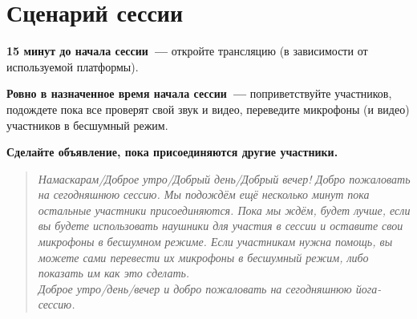 \newpage
\section*{Сценарий сессии}
\label{sec:plan}

\textbf{15 минут до начала сессии~---} откройте трансляцию (в зависимости от используемой платформы). 

\textbf{Ровно в назначенное время начала сессии~---} поприветствуйте участников, подождете пока все проверят свой звук и видео, переведите микрофоны (и видео) участников в бесшумный режим.

\textbf{Сделайте объявление, пока присоединяются другие участники.}
\begin{quote}\emph{%
\noindent%
Намаскарам/Доброе утро/Добрый день/Добрый вечер!
Добро пожаловать на сегодняшнюю сессию. Мы подождём ещё несколько
минут пока остальные участники присоединяются. Пока мы ждём, будет
лучше, если вы будете использовать наушники для участия в сессии и
оставите свои микрофоны в бесшумном режиме. {\color{CadetBlue}Если участникам нужна помощь, вы можете сами перевести их микрофоны в бесшумный режим, либо показать им как это сделать.}
\\[3pt]
Доброе утро/день/вечер и добро пожаловать на сегодняшнюю
йога-сессию.
}\end{quote}


